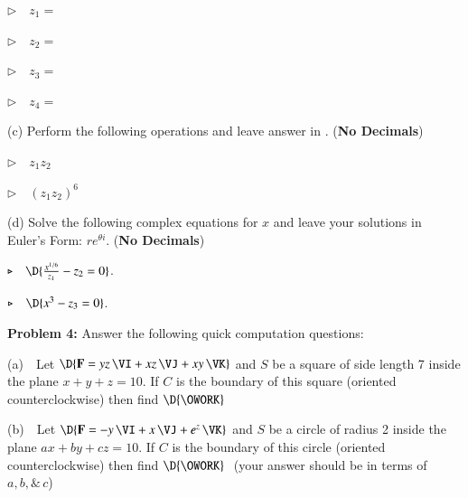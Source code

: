 \documentclass[11pt]{article}
\begin{document}
\vspace{0.3cm}

\qquad $\triangleright \quad z_1 = $

\vspace{1.2cm}

\qquad $\triangleright \quad z_2 = $

\vspace{1.2cm}

\qquad $\triangleright \quad z_3 = $

\vspace{1.2cm}

\qquad $\triangleright \quad z_4 = $

\vspace{1.2cm}

(c) Perform the following operations and leave answer in . ({\bf No Decimals})

\vspace{0.5cm}

\qquad $\triangleright \quad z_1z_2$

\vspace{1.0cm}

\qquad $\triangleright \quad (z_1z_2)^6$

\vspace{1.0cm}

(d) Solve the following complex equations for $x$ and leave your solutions in Euler's Form: $re^{\theta i}$. ({\bf No Decimals})

\qquad $\triangleright \quad \D{\frac{x^{1/6}}{z_1} - z_2 = 0}$.

\vspace{2.0cm}

\qquad $\triangleright \quad \D{x^3-z_3=0}$.

\thispagestyle{empty}
\newpage
\thispagestyle{empty}

{\bf Problem 4:}  Answer the following quick computation questions:

(a) \,\, Let $\D{{\bf F} = yz\,\VI + xz\, \VJ + xy\, \VK}$ and $S$ be a square of side length 7 inside the plane $x+y+z=10$.  If $C$ is the boundary of this square (oriented counterclockwise) then find $\D{\OWORK}$ 

\vspace{4.2cm}

(b) \,\, Let $\D{{\bf F} = -y\,\VI + x\, \VJ + e^z\, \VK}$ and $S$ be a circle of radius 2 inside the plane $ax+by+cz=10$.  If $C$ is the boundary of this circle (oriented counterclockwise) then find $\D{\OWORK}$ \,\,(your answer should be in terms of $a,b, \& \, c$)
\end{document}
